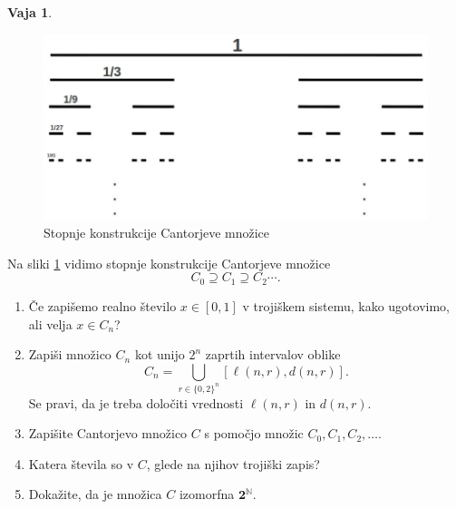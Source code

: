 \documentclass{article}
\newcommand{\two}{\mathbf{2}}
\newcommand{\NN}{\mathbb{N}}
\theoremstyle{definition}
\newtheorem{vaja}{Vaja}
\begin{document}
\begin{vaja}
  \begin{figure}[!h]
    \includegraphics{cantor_set.jpg}
    \caption{Stopnje konstrukcije Cantorjeve množice}
    \label{fig:cantor_set}
  \end{figure}
  Na sliki \ref{fig:cantor_set} vidimo stopnje konstrukcije Cantorjeve množice
  $$C_0 \supseteq C_1 \supseteq C_2 \cdots.$$
  \begin{enumerate}
  \item Če zapišemo realno število $x \in [0,1]$ v trojiškem sistemu, kako ugotovimo, ali
    velja $x \in C_n$?

  \item Zapiši množico $C_n$ kot unijo $2^n$ zaprtih intervalov oblike
    \begin{equation*}
      C_n = \bigcup_{r \in \{0,2\}^n} [\ell(n, r), d(n, r)].
    \end{equation*}
    Se pravi, da je treba določiti vrednosti $\ell(n, r)$ in $d(n, r)$.

  \item Zapišite Cantorjevo množico $C$ s pomočjo množic $C_0, C_1, C_2, \ldots$.

  \item Katera števila so v $C$, glede na njihov trojiški zapis?

  \item Dokažite, da je množica $C$ izomorfna $\two^\NN$.
  \end{enumerate}
\end{vaja}
\end{document}

